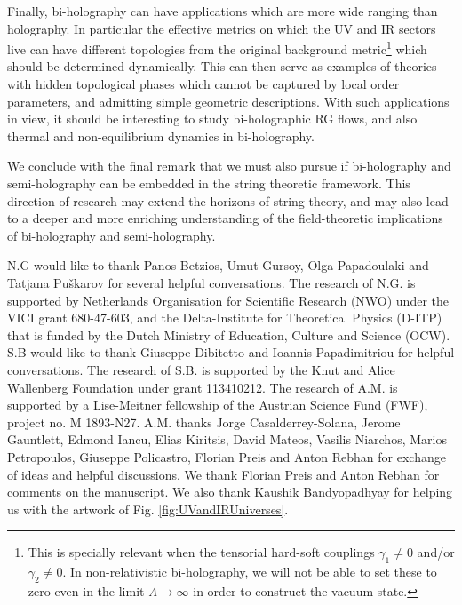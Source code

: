 \documentclass[prd,reprint,a4paper,showpacs,superscriptaddress,11pt,onecolumn,nofootinbib]{revtex4-1}
\renewcommand{\(}{\left(}
\renewcommand{\)}{\right)}
\newcommand{\6}{\partial}
\begin{document}
Finally, bi-holography can have applications which are more wide ranging than holography. In particular the effective metrics on which the UV and IR sectors live can have different topologies from the original background metric\footnote{This is specially relevant when the tensorial hard-soft couplings $\gamma_1 \neq 0$ and/or $\gamma_2 \neq 0$. In non-relativistic bi-holography, we will not be able to set these to zero even in the limit $\Lambda\rightarrow\infty$ in order to construct the vacuum state.} which should be determined dynamically. This can then serve as examples of theories with hidden topological phases which cannot be captured by local order parameters, and admitting simple geometric descriptions. With such applications in view, it should be interesting to study bi-holographic RG flows, and also thermal and non-equilibrium dynamics in bi-holography.

We conclude with the final remark that we must also pursue if bi-holography and semi-holography can be embedded in the string theoretic framework. This direction of research may extend the horizons of string theory, and may also lead to a deeper and more enriching understanding of the field-theoretic implications of bi-holography and semi-holography.

\begin{acknowledgments}
N.G would like to thank Panos Betzios, Umut Gursoy, Olga Papadoulaki and Tatjana Pu\v{s}karov for several helpful conversations. The research of N.G. is supported by Netherlands Organisation for Scientific Research (NWO) under the VICI grant 680-47-603, and the Delta-Institute for Theoretical Physics (D-ITP) that is funded by the Dutch Ministry of Education, Culture and Science (OCW). S.B would like to thank Giuseppe Dibitetto and Ioannis Papadimitriou for helpful conversations. The research of S.B. is supported by the Knut and Alice Wallenberg Foundation under grant 113410212. The research of A.M. is supported by a Lise-Meitner fellowship of the Austrian Science Fund (FWF), project no. M 1893-N27. A.M. thanks Jorge Casalderrey-Solana, Jerome Gauntlett, Edmond Iancu, Elias Kiritsis, David Mateos, Vasilis Niarchos, Marios Petropoulos, Giuseppe Policastro, Florian Preis and Anton Rebhan for exchange of ideas and helpful discussions. We thank Florian Preis and Anton Rebhan for comments on the manuscript. We also thank Kaushik Bandyopadhyay for helping us with the artwork of Fig. \ref{fig:UVandIRUniverses}.
\end{acknowledgments}



\end{document}
